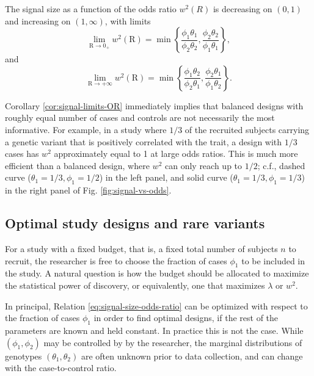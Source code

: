 \begin{corollary} \label{cor:signal-limits-OR}
The signal size as a function of the odds ratio $w^2(R)$ is decreasing on $(0,1)$ and increasing on $(1,\infty)$, with limits
\begin{equation} \label{eq:signal-size-upper-bound-1}
    \lim_{\text{R}\to0_+} w^2(\text{R}) = \min\left\{\frac{\phi_1\theta_1}{\phi_2\theta_2}, \frac{\phi_2\theta_2}{\phi_1\theta_1}\right\},
\end{equation}
and
\begin{equation} \label{eq:signal-size-upper-bound-2}
    \lim_{\text{R}\to+\infty} w^2(\text{R}) = \min\left\{\frac{\phi_1\theta_2}{\phi_2\theta_1}, \frac{\phi_2\theta_1}{\phi_1\theta_2}\right\}.
\end{equation}
\end{corollary}
Corollary \ref{cor:signal-limits-OR} immediately implies that balanced designs with roughly equal number of cases and controls are not necessarily the most informative.
For example, in a study where $1/3$ of the recruited subjects carrying a genetic variant that is positively correlated with the trait, a design with $1/3$ cases has $w^2$ approximately equal to 1 at large odds ratios.
This is much more efficient than a balanced design, where $w^2$ can only reach up to $1/2$; c.f., dashed curve ($\theta_1=1/3,\phi_1=1/2$) in the left panel, and solid curve ($\theta_1=1/3,\phi_1=1/3$) in the right panel of Fig. \ref{fig:signal-vs-odds}.

\subsection{Optimal study designs and rare variants}
\label{subsec:optimal-design} 

For a study with a fixed budget, that is, a fixed total number of subjects $n$ to recruit, the researcher is free to choose the fraction of cases $\phi_1$ to be included in the study.
A natural question is how the budget should be allocated to maximize the statistical power of discovery, or equivalently, one that maximizes $\lambda$ or $w^2$.


In principal, Relation \eqref{eq:signal-size-odds-ratio} can be optimized with respect to the fraction of cases $\phi_1$ in order to find optimal designs, if the rest of the parameters are known and held constant.
In practice this is not the case.
While $(\phi_1, \phi_2)$ may be controlled by by the researcher, the marginal distributions of genotypes $(\theta_1, \theta_2)$ are often unknown prior to data collection, and can change with the case-to-control ratio.

